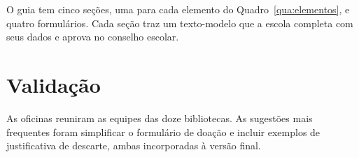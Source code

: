 O guia tem cinco seções, uma para cada elemento do Quadro~\ref{qua:elementos}, e quatro formulários. Cada seção traz um texto-modelo que a escola completa com seus dados e aprova no conselho escolar.

\section{Validação}

As oficinas reuniram as equipes das doze bibliotecas. As sugestões mais frequentes foram simplificar o formulário de doação e incluir exemplos de justificativa de descarte, ambas incorporadas à versão final.
